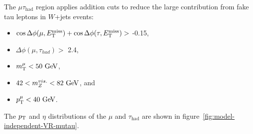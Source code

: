 The $\mu\tau_{\mathrm{had}}$ region applies addition cuts to reduce the large contribution from fake tau leptons in $W$+jets events:

\begin{itemize}
	\item $\cos{\Delta\phi(\mu, \ensuremath{E_{\text{T}}^{\text{miss}}})} + \cos{\Delta\phi(\tau, \ensuremath{E_{\text{T}}^{\text{miss}}})} >$ -0.15,
	\item $\Delta\phi(\mu, \tau_{had}) >$ 2.4,
	\item $m_{\mathrm{T}}^{\mu} < 50 \GeV$,
	\item $42< m_{Z}^{vis.} < 82 \GeV$, and
	\item $\pt^{\mu} < 40 \GeV$.
\end{itemize}

The $p_{\text{T}}$ and $\eta$ distributions of the $\mu$ and $\tau_{\mathrm{had}}$ are shown in figure~\ref{fig:model-independent-VR-mutau}.

